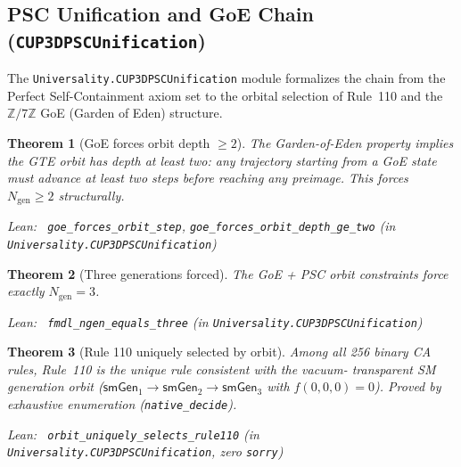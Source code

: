 \documentclass[11pt,a4paper]{article}
\newenvironment{leanref}%
  {\par\smallskip\noindent\begingroup\raggedright\textup{Lean:}~}%
  {\par\endgroup}
\newtheorem{theorem}{Theorem}[section]
\theoremstyle{definition}
\begin{document}
\subsection{PSC Unification and GoE Chain (\texttt{CUP3DPSCUnification})}\label{subsec:cup3d-psc-unification}

The \texttt{Universality.CUP3DPSCUnification} module formalizes the chain from the
Perfect Self-Containment axiom set to the orbital selection of Rule~110 and the
$\mathbb{Z}/7\mathbb{Z}$ GoE (Garden of Eden) structure.

\begin{theorem}[GoE forces orbit depth $\ge 2$]\label{thm:goe-orbit-depth}
The Garden-of-Eden property implies the GTE orbit has depth at least two: any trajectory
starting from a GoE state must advance at least two steps before reaching any preimage.
This forces $N_{\mathrm{gen}} \ge 2$ structurally.

\begin{leanref}
\lstinline|goe_forces_orbit_step|, \lstinline|goe_forces_orbit_depth_ge_two|
\textup{(in \texttt{Universality.CUP3DPSCUnification})}
\end{leanref}
\end{theorem}

\begin{theorem}[Three generations forced]\label{thm:ngen-three}
The GoE + PSC orbit constraints force exactly $N_{\mathrm{gen}} = 3$.

\begin{leanref}
\lstinline|fmdl_ngen_equals_three|
\textup{(in \texttt{Universality.CUP3DPSCUnification})}
\end{leanref}
\end{theorem}

\begin{theorem}[Rule 110 uniquely selected by orbit]\label{thm:cup1-orbit}
Among all 256 binary CA rules, Rule~110 is the unique rule consistent with the vacuum-
transparent SM generation orbit ($\mathsf{smGen}_1 \to \mathsf{smGen}_2 \to \mathsf{smGen}_3$
with $f(0,0,0)=0$).  Proved by exhaustive enumeration (\texttt{native\_decide}).

\begin{leanref}
\lstinline|orbit_uniquely_selects_rule110|
\textup{(in \texttt{Universality.CUP3DPSCUnification}, zero \texttt{sorry})}
\end{leanref}
\end{theorem}
\end{document}
